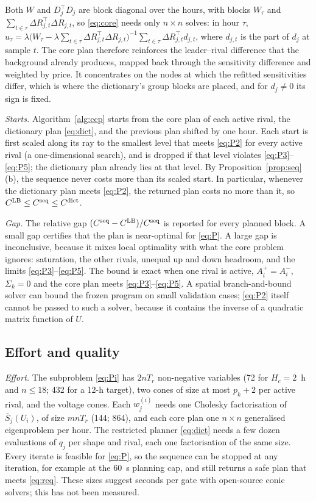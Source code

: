 \documentclass[journal,onecolumn,11pt]{IEEEtran}
\newcommand{\tp}{^{\top}}
\begin{document}
Both $W$ and $D_j\tp D_j$ are block diagonal over the hours, with blocks $W_\tau$ and $\sum_{t\in\tau}\Delta R_{j,t}\tp\Delta R_{j,t}$, so \eqref{eq:core} needs only $n\times n$ solves: in hour $\tau$, $u_\tau=\lambda\big(W_\tau-\lambda\sum_{t\in\tau}\Delta R_{j,t}\tp\Delta R_{j,t}\big)^{-1}\sum_{t\in\tau}\Delta R_{j,t}\tp d_{j,t}$, where $d_{j,t}$ is the part of $d_j$ at sample $t$. The core plan therefore reinforces the leader--rival difference that the background already produces, mapped back through the sensitivity difference and weighted by price. It concentrates on the nodes at which the refitted sensitivities differ, which is where the dictionary's group blocks are placed, and for $d_j\ne0$ its sign is fixed.

\emph{Starts.} Algorithm~\ref{alg:ccp} starts from the core plan of each active rival, the dictionary plan \eqref{eq:dict}, and the previous plan shifted by one hour. Each start is first scaled along its ray to the smallest level that meets \eqref{eq:P2} for every active rival (a one-dimensional search), and is dropped if that level violates \eqref{eq:P3}--\eqref{eq:P5}; the dictionary plan already lies at that level. By Proposition~\ref{prop:seq}(b), the sequence never costs more than its scaled start. In particular, whenever the dictionary plan meets \eqref{eq:P2}, the returned plan costs no more than it, so $C^{\rm LB}\le C^{\rm seq}\le C^{\rm dict}$.

\emph{Gap.} The relative gap $(C^{\rm seq}-C^{\rm LB})/C^{\rm seq}$ is reported for every planned block. A small gap certifies that the plan is near-optimal for \eqref{eq:P}. A large gap is inconclusive, because it mixes local optimality with what the core problem ignores: saturation, the other rivals, unequal up and down headroom, and the limits \eqref{eq:P3}--\eqref{eq:P5}. The bound is exact when one rival is active, $A_i^+=A_i^-$, $\Sigma_k=0$ and the core plan meets \eqref{eq:P3}--\eqref{eq:P5}. A spatial branch-and-bound solver can bound the frozen program on small validation cases; \eqref{eq:P2} itself cannot be passed to such a solver, because it contains the inverse of a quadratic matrix function of $U$.

\subsection{Effort and quality}\label{sec:quality}
\emph{Effort.} The subproblem \eqref{eq:Pi} has $2nT_r$ non-negative variables (72 for $H_c=2$~h and $n\le18$; 432 for a 12-h target), two cones of size at most $p_k+2$ per active rival, and the voltage cones. Each $w_j^{(i)}$ needs one Cholesky factorisation of $\bar S_j(U_i)$, of size $mnT_r$ (144; 864), and each core plan one $n\times n$ generalised eigenproblem per hour. The restricted planner \eqref{eq:dict} needs a few dozen evaluations of $q_j$ per shape and rival, each one factorisation of the same size. Every iterate is feasible for \eqref{eq:P}, so the sequence can be stopped at any iteration, for example at the 60~s planning cap, and still returns a safe plan that meets \eqref{eq:req}. These sizes suggest seconds per gate with open-source conic solvers; this has not been measured.
\end{document}

